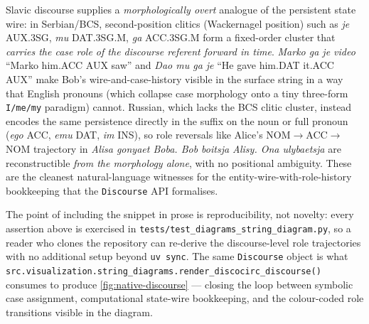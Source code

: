 \documentclass[
]{article}
\begin{document}
Slavic discourse supplies a \emph{morphologically overt} analogue of the
persistent state wire: in Serbian/BCS, second-position clitics
(Wackernagel position) such as \emph{je} AUX.3SG, \emph{mu} DAT.3SG.M,
\emph{ga} ACC.3SG.M form a fixed-order cluster that \emph{carries the
case role of the discourse referent forward in time}. \emph{Marko ga je
video} ``Marko him.ACC AUX saw'' and \emph{Dao mu ga je} ``He gave
him.DAT it.ACC AUX'' make Bob's wire-and-case-history visible in the
surface string in a way that English pronouns (which collapse case
morphology onto a tiny three-form \texttt{I/me/my} paradigm) cannot.
Russian, which lacks the BCS clitic cluster, instead encodes the same
persistence directly in the suffix on the noun or full pronoun
(\emph{ego} ACC, \emph{emu} DAT, \emph{im} INS), so role reversals like
Alice's NOM\(\to\)ACC\(\to\)NOM trajectory in \emph{Alisa gonyaet Boba.
Bob boitsja Alisy. Ona ulybaetsja} are reconstructible \emph{from the
morphology alone}, with no positional ambiguity. These are the cleanest
natural-language witnesses for the entity-wire-with-role-history
bookkeeping that the \texttt{Discourse} API formalises.

The point of including the snippet in prose is reproducibility, not
novelty: every assertion above is exercised in
\texttt{tests/test\_diagrams\_string\_diagram.py}, so a reader who
clones the repository can re-derive the discourse-level role
trajectories with no additional setup beyond \texttt{uv\ sync}. The same
\texttt{Discourse} object is what
\texttt{src.visualization.string\_diagrams.render\_discocirc\_discourse()}
consumes to produce \autoref{fig:native-discourse} --- closing the loop
between symbolic case assignment, computational state-wire bookkeeping,
and the colour-coded role transitions visible in the diagram.
\end{document}
